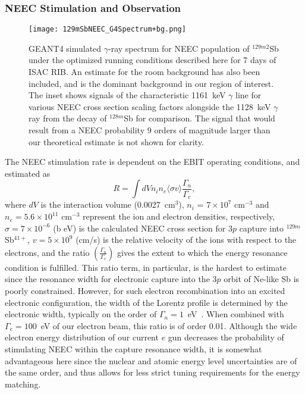 \documentclass[12pt]{article}
\begin{document}
\subsubsection{\label{cycling}NEEC Stimulation and Observation}
\begin{figure}[t!]
\begin{center}
\texttt{[image: 129mSbNEEC\_G4Spectrum+bg.png]}
\end{center}
  \caption{\small GEANT4 simulated $\gamma$-ray spectrum for NEEC population of $^{129m2}$Sb under the optimized running conditions described here for 7 days of ISAC RIB. An estimate for the room background has also been included, and is the dominant background in our region of interest.  The inset shows signals of the characteristic 1161~keV $\gamma$ line for various NEEC cross section scaling factors alongside the 1128~keV $\gamma$ ray from the decay of $^{128m}$Sb for comparison.  The signal that would result from a NEEC probability 9 orders of magnitude larger than our theoretical estimate is not shown for clarity.}
  \label{SimulatedSpectrum}
\end{figure}
The NEEC stimulation rate is dependent on the EBIT operating conditions, and estimated as
\begin{equation}
    R=\int dV n_i n_e \langle\sigma v\rangle \frac{\Gamma_n}{\Gamma_e},
\end{equation}
where $dV$ is the interaction volume (0.0027~cm$^3$), $n_i$ = $7\times10^{7}$ cm$^{-3}$ and $n_e = 5.6\times10^{11}$ cm$^{-3}$ represent the ion and electron densities, respectively, $\sigma=7\times10^{-6}$ (b eV) is the calculated NEEC cross section for $3p$ capture into $^{129m}$Sb$^{41+}$, $v=5\times10^9$ (cm/s) is the relative velocity of the ions with respect to the electrons, and the ratio $\left(\frac{\Gamma_n}{\Gamma_e}\right)$ gives the extent to which the energy resonance condition is fulfilled.  This ratio term, in particular, is the hardest to estimate since the resonance width for electronic capture into the $3p$ orbit of Ne-like Sb is poorly constrained.  However, for such electron recombination into an excited electronic configuration, the width of the Lorentz profile is determined by the electronic width, typically on the order of $\Gamma_n=1$~eV~\cite{Pal19}.  When combined with $\Gamma_e=100$~eV of our electron beam, this ratio is of order 0.01.    Although the wide electron energy distribution of our current $e$ gun decreases the probability of stimulating NEEC within the capture resonance width, it is somewhat advantageous here since the nuclear and atomic energy level uncertainties are of the same order, and thus allows for less strict tuning requirements for the energy matching.
\end{document}
